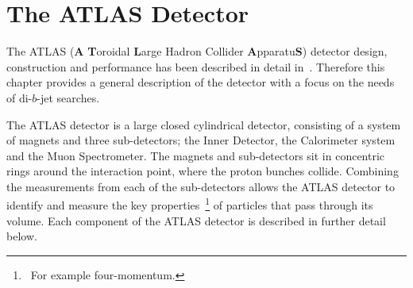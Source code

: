 

\section{The ATLAS Detector}
\label{sec:det-ATLAS}

The ATLAS (\textbf{A} \textbf{T}oroidal \textbf{L}arge Hadron Collider \textbf{A}pparatu\textbf{S}) detector
design, construction and performance has been described in detail in~\cite{det-ATLAS_Exp, det-ATLAS_TDR, det-ATLAS_Perf}.
Therefore this chapter provides a general description of the detector with a focus on the needs of di-$b$-jet searches.

The ATLAS detector is a large closed cylindrical detector,
consisting of a system of magnets and three sub-detectors; the Inner Detector, the Calorimeter system and the Muon Spectrometer.
The magnets and sub-detectors sit in concentric rings around the interaction point, where the proton bunches collide.
Combining the measurements from each of the sub-detectors allows the 
ATLAS detector to identify and measure the key properties~\footnote{\ For example four-momentum.}
of particles that pass through its volume.
Each component of the ATLAS detector is described in further detail below.

